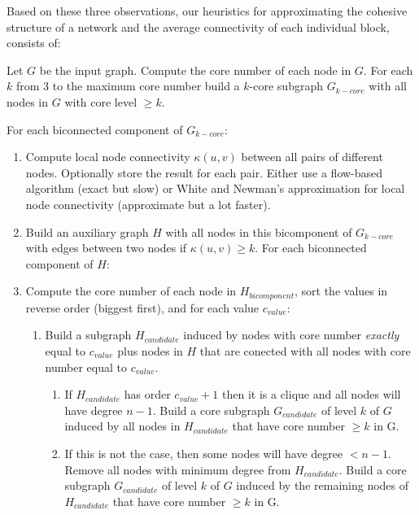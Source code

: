 Based on these three observations, our heuristics for approximating the cohesive structure of a network and the average connectivity of each individual block, consists of: 

Let $G$ be the input graph. Compute the core number of each node in $G$. For each $k$ from 3 to the maximum core number build a $k$-core subgraph $G_{k-core}$ with all nodes in $G$ with core level $\ge k$.

For each biconnected component of $G_{k-core}$:

\begin{enumerate}

\item Compute local node connectivity $\kappa(u,v)$ between all pairs of different nodes. Optionally store the result for each pair. Either use a flow-based algorithm (exact but slow) or White and Newman's approximation for local node connectivity (approximate but a lot faster).

\item Build an auxiliary graph $H$ with all nodes in this bicomponent of $G_{k-core}$ with edges between two nodes if $\kappa(u,v) \ge k$. For each biconnected component of $H$:

\item Compute the core number of each node in $H_{bicomponent}$, sort the values in reverse order (biggest first), and for each value $c_{value}$:

\begin{enumerate}

\item Build a subgraph $H_{candidate}$ induced by nodes with core number \emph{exactly} equal to $c_{value}$ plus nodes in $H$ that are conected with all nodes with core number equal to $c_{value}$.

\begin{enumerate}
\item If $H_{candidate}$ has order $c_{value} + 1$ then it is a clique and all nodes will have degree $n - 1$. Build a core subgraph $G_{candidate}$ of level $k$ of $G$ induced by all nodes in $H_{candidate}$ that have core number $\ge k$ in G.

\item If this is not the case, then some nodes will have degree $< n - 1$. Remove all nodes with minimum degree from $H_{candidate}$. Build a core subgraph $G_{candidate}$ of level $k$ of $G$ induced by the remaining nodes of $H_{candidate}$ that have core number $\ge k$ in G. 


\end{enumerate}
\end{enumerate}
\end{enumerate}
